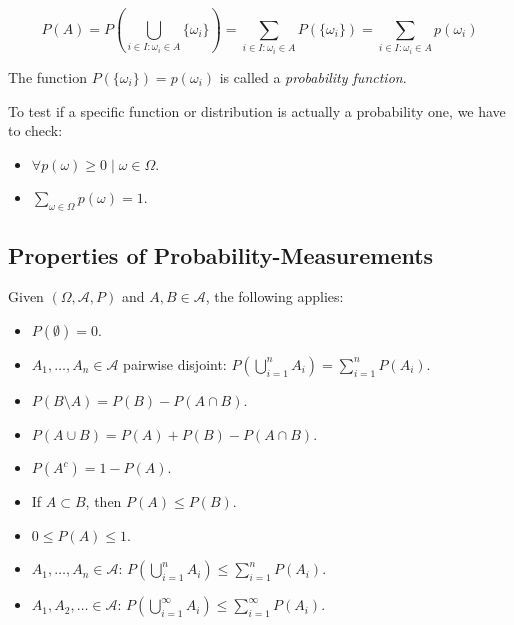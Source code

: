 \[
    P(A) = P\left( \bigcup_{i \in I: \omega_i \in A} \{\omega_i\}\right) = 
    \sum_{i \in I: \omega_i \in A} P(\{\omega_i\}) = \sum_{i \in I: \omega_i \in A} p(\omega_i)
\]

The function \(P(\{\omega_i\}) = p(\omega_i)\) is called a \emph{probability function}.

To test if a specific function or distribution is actually a probability one, we have to check:

\begin{itemize}
    
    \item \(\forall p(\omega) \ge 0 \mid \omega \in \Omega\).

    \item \(\sum_{\omega \in \Omega} p(\omega) = 1\).

\end{itemize}

\subsection{Properties of Probability-Measurements}

Given \((\Omega, \mathcal{A}, P)\) and \(A,B \in \mathcal{A}\), the following applies:


\begin{itemize}

    \item \( P(\emptyset) = 0 \).
    
    \item \( A_1, \ldots, A_n \in \mathcal{A} \) pairwise disjoint: \( P\left(\bigcup_{i=1}^n A_i\right) = \sum_{i=1}^n P(A_i) \).
    
    \item \( P(B \setminus A) = P(B) - P(A \cap B) \).
    
    \item \( P(A \cup B) = P(A) + P(B) - P(A \cap B) \).
    
    \item \( P(A^c) = 1 - P(A) \).
    
    \item If \( A \subset B \), then \( P(A) \le P(B) \).
    
    \item \( 0 \le P(A) \le 1 \).

    \item \( A_1, \ldots, A_n \in \mathcal{A} \): \( P\left(\bigcup_{i=1}^n A_i\right) \le \sum_{i=1}^n P(A_i) \).
    
    \item \( A_1, A_2, \ldots \in \mathcal{A} \): \( P\left(\bigcup_{i=1}^{\infty} A_i\right) \le \sum_{i=1}^{\infty} P(A_i) \).

\end{itemize}

